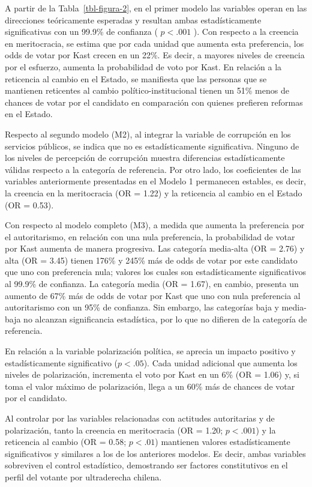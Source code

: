 \documentclass[
  spanish,
  a4paper,
  oneside]{scrbook}
\begin{document}
A partir de la Tabla~\ref{tbl-figura-2}, en el primer modelo las
variables operan en las direcciones teóricamente esperadas y resultan
ambas estadísticamente significativas con un 99.9\% de confianza (
\(p < .001\) ). Con respecto a la creencia en meritocracia, se estima
que por cada unidad que aumenta esta preferencia, los odds de votar por
Kast crecen en un 22\%. Es decir, a mayores niveles de creencia por el
esfuerzo, aumenta la probabilidad de voto por Kast. En relación a la
reticencia al cambio en el Estado, se manifiesta que las personas que se
mantienen reticentes al cambio político-institucional tienen un 51\%
menos de chances de votar por el candidato en comparación con quienes
prefieren reformas en el Estado.

Respecto al segundo modelo (M2), al integrar la variable de corrupción
en los servicios públicos, se indica que no es estadísticamente
significativa. Ninguno de los niveles de percepción de corrupción
muestra diferencias estadísticamente válidas respecto a la categoría de
referencia. Por otro lado, los coeficientes de las variables
anteriormente presentadas en el Modelo 1 permanecen estables, es decir,
la creencia en la meritocracia (OR = 1.22) y la reticencia al cambio en
el Estado (OR = 0.53).

Con respecto al modelo completo (M3), a medida que aumenta la
preferencia por el autoritarismo, en relación con una nula preferencia,
la probabilidad de votar por Kast aumenta de manera progresiva. Las
categoría media-alta (OR = 2.76) y alta (OR = 3.45) tienen 176\% y 245\%
más de odds de votar por este candidato que uno con preferencia nula;
valores los cuales son estadísticamente significativos al 99.9\% de
confianza. La categoría media (OR = 1.67), en cambio, presenta un
aumento de 67\% más de odds de votar por Kast que uno con nula
preferencia al autoritarismo con un 95\% de confianza. Sin embargo, las
categorías baja y media-baja no alcanzan significancia estadística, por
lo que no difieren de la categoría de referencia.

En relación a la variable polarización política, se aprecia un impacto
positivo y estadísticamente significativo (\(p < .05\)). Cada unidad
adicional que aumenta los niveles de polarización, incrementa el voto
por Kast en un 6\% (OR = 1.06) y, si toma el valor máximo de
polarización, llega a un 60\% más de chances de votar por el candidato.

Al controlar por las variables relacionadas con actitudes autoritarias y
de polarización, tanto la creencia en meritocracia (OR = 1.20;
\(p < .001\)) y la reticencia al cambio (OR = 0.58; \(p < .01\))
mantienen valores estadísticamente significativos y similares a los de
los anteriores modelos. Es decir, ambas variables sobreviven el control
estadístico, demostrando ser factores constitutivos en el perfil del
votante por ultraderecha chilena.
\end{document}
